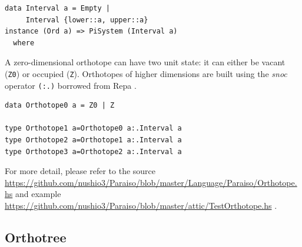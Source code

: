 \documentclass[twocolumn]{article}
\begin{document}
\begin{verbatim}
data Interval a = Empty |
     Interval {lower::a, upper::a}
instance (Ord a) => PiSystem (Interval a) 
  where
\end{verbatim}

A zero-dimensional orthotope can have two unit state: it can either be vacant
({\tt Z0}) or occupied ({\tt Z}). Orthotopes of higher dimensions are built
using the {\em snoc} operator {\tt (:.)} borrowed from Repa
\cite{Keller:2010:RSP:1932681.1863582}.

\begin{verbatim}
data Orthotope0 a = Z0 | Z

type Orthotope1 a=Orthotope0 a:.Interval a
type Orthotope2 a=Orthotope1 a:.Interval a
type Orthotope3 a=Orthotope2 a:.Interval a
\end{verbatim}

For more detail, please refer to the source
\url{https://github.com/nushio3/Paraiso/blob/master/Language/Paraiso/Orthotope.hs}
and example
\url{https://github.com/nushio3/Paraiso/blob/master/attic/TestOrthotope.hs} .

\subsection{Orthotree} \label{SectionOrthotree}
\end{document}
